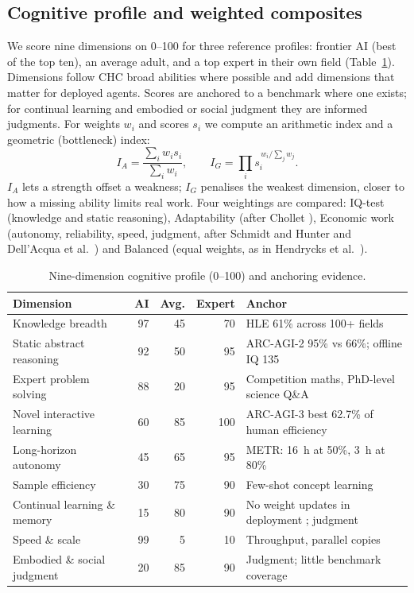 \documentclass[11pt]{article}
\begin{document}
\subsection{Cognitive profile and weighted composites}
We score nine dimensions on 0--100 for three reference profiles: frontier AI (best of the top ten), an average adult, and a top expert in their own field (Table~\ref{tab:profile}). Dimensions follow CHC broad abilities where possible and add dimensions that matter for deployed agents. Scores are anchored to a benchmark where one exists; for continual learning and embodied or social judgment they are informed judgments. For weights $w_i$ and scores $s_i$ we compute an arithmetic index and a geometric (bottleneck) index:
\begin{equation}
I_A=\frac{\sum_i w_i s_i}{\sum_i w_i},\qquad I_G=\prod_i s_i^{\,w_i/\sum_j w_j}.
\end{equation}
$I_A$ lets a strength offset a weakness; $I_G$ penalises the weakest dimension, closer to how a missing ability limits real work. Four weightings are compared: IQ-test (knowledge and static reasoning), Adaptability (after Chollet \citep{chollet2019}), Economic work (autonomy, reliability, speed, judgment, after Schmidt and Hunter and Dell'Acqua et al.\ \citep{schmidt1998,dellacqua2023}) and Balanced (equal weights, as in Hendrycks et al.\ \citep{hendrycks2025}).

\begin{table}[htbp]
\centering\small
\caption{Nine-dimension cognitive profile (0--100) and anchoring evidence.}
\label{tab:profile}
\begin{tabular}{@{}lrrrp{6.1cm}@{}}
\toprule
Dimension & AI & Avg. & Expert & Anchor \\
\midrule
Knowledge breadth & 97 & 45 & 70 & HLE 61\% across 100+ fields \\
Static abstract reasoning & 92 & 50 & 95 & ARC-AGI-2 95\% vs 66\%; offline IQ 135 \\
Expert problem solving & 88 & 20 & 95 & Competition maths, PhD-level science Q\&A \\
Novel interactive learning & 60 & 85 & 100 & ARC-AGI-3 best 62.7\% of human efficiency \\
Long-horizon autonomy & 45 & 65 & 95 & METR: 16~h at 50\%, 3~h at 80\% \\
Sample efficiency & 30 & 75 & 90 & Few-shot concept learning \citep{lake2017} \\
Continual learning \& memory & 15 & 80 & 90 & No weight updates in deployment \citep{kirkpatrick2017,hendrycks2025}; judgment \\
Speed \& scale & 99 & 5 & 10 & Throughput, parallel copies \\
Embodied \& social judgment & 20 & 85 & 90 & Judgment; little benchmark coverage \\
\bottomrule
\end{tabular}
\end{table}
\end{document}
